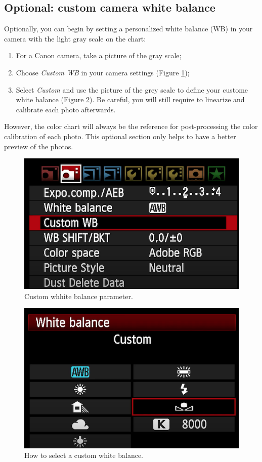 \documentclass[
]{book}
\begin{document}
\hypertarget{optional-custom-camera-white-balance}{%
\subsection{Optional: custom camera white balance}\label{optional-custom-camera-white-balance}}

Optionally, you can begin by setting a personalized white balance (WB) in
your camera with the light gray scale on the chart:

\begin{enumerate}
\def\labelenumi{\arabic{enumi}.}
\item
  For a Canon camera, take a picture of the gray scale;
\item
  Choose \emph{Custom WB} in your camera settings (Figure \ref{fig:WB});
\item
  Select \emph{Custom} and use the picture of the grey scale to define your custome white balance (Figure \ref{fig:WB2}). Be careful, you will still require to linearize and calibrate each photo afterwards.
\end{enumerate}

However, the color chart will always be the reference for
post-processing the color calibration of each photo. This optional
section only helps to have a better preview of the photos.

\begin{figure}

{\centering \includegraphics[width=0.5\linewidth]{Figures/Custom_WB_setting} 

}

\caption{Custom whhite balance parameter.}\label{fig:WB}
\end{figure}

\begin{figure}

{\centering \includegraphics[width=0.5\linewidth]{Figures/Custom_WB_selection} 

}

\caption{How to select a custom white balance.}\label{fig:WB2}
\end{figure}
\end{document}
